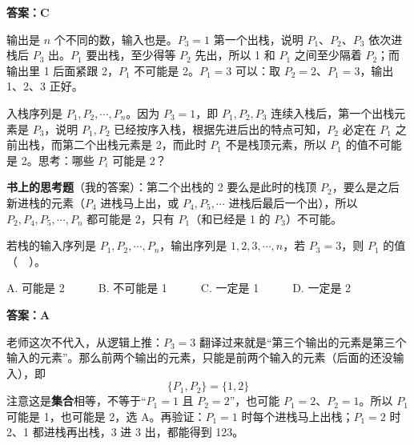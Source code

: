 \documentclass[10.5pt,a4paper,oneside]{article}
\newcommand{\hlred}[1]{\textcolor{wdred}{\bfseries #1}}
\newcommand{\cueblock}[2]{\Needspace{4\baselineskip}\leavevmode#1{#2}\par\vspace{-\baselineskip}\vspace{-\parskip}}
\newcommand{\cuebox}[1]{\leavevmode\llap{\smash{\begin{minipage}[t]{\marginparwidth}\raggedright\small\linespread{1.18}\selectfont #1\end{minipage}}\hspace{\marginparsep}}}
\newcommand{\cuenote}[1]{\cuebox{{\color{wdblue}\bfseries Q\,}\color{wddark}#1}}
\begin{document}
\hlred{\textbf{答案：C}}

\begin{videobox}

输出是 \(n\) 个不同的数，输入也是。\(P_3=1\) 第一个出栈，说明
\(P_1\)、\(P_2\)、\(P_3\) 依次进栈后 \(P_3\) 出。\(P_1\)
要出栈，至少得等 \(P_2\) 先出，所以 1 和 \(P_1\) 之间至少隔着
\(P_2\)；而输出里 1 后面紧跟 2，\(P_1\) 不可能是 2。\(P_1=3\) 可以：取
\(P_2=2\)、\(P_1=3\)，输出 1、2、3 正好。

\end{videobox}

\begin{jiexibox}

入栈序列是 \(P_1, P_2, \cdots, P_n\)。因为 \(P_3=1\)，即
\(P_1, P_2, P_3\) 连续入栈后，第一个出栈元素是 \(P_3\)，说明
\(P_1, P_2\) 已经按序入栈，根据先进后出的特点可知，\(P_2\) 必定在
\(P_1\) 之前出栈，而第二个出栈元素是 2，而此时 \(P_1\)
不是栈顶元素，所以 \(P_1\) 的值不可能是 2。思考：哪些 \(P_i\) 可能是 2？

\end{jiexibox}

\begin{addbox}

\textbf{书上的思考题}（我的答案）：第二个出栈的 2 要么是此时的栈顶
\(P_2\)，要么是之后新进栈的元素（\(P_4\) 进栈马上出，或
\(P_4, P_5, \cdots\) 进栈后最后一个出），所以
\(P_2, P_4, P_5, \cdots, P_n\) 都可能是 2，只有 \(P_1\)（和已经是 1 的
\(P_3\)）不可能。

\end{addbox}

\vspace{22pt}

\cueblock{\cuenote}{\relax{\(P_3=3\) 能推出 \(\{P_1, P_2\}\) 是什么？}}

\begin{questionbox}[21]

若栈的输入序列是 \(P_1, P_2, \cdots, P_n\)，输出序列是
\(1, 2, 3, \cdots, n\)，若 \(P_3=3\)，则 \(P_1\) 的值（　）。

A. 可能是 2　　　B. 不可能是 1　　　C. 一定是 1　　　D. 一定是 2

\end{questionbox}

\hlred{\textbf{答案：A}}

\begin{videobox}

老师这次不代入，从逻辑上推：\(P_3=3\)
翻译过来就是“第三个输出的元素是第三个输入的元素”。那么前两个输出的元素，只能是前两个输入的元素（后面的还没输入），即
\[\{P_1, P_2\}=\{1, 2\}\] 注意这是\textbf{集合}相等，不等于“\(P_1=1\) 且
\(P_2=2\)”，也可能 \(P_1=2\)、\(P_2=1\)。所以 \(P_1\) 可能是 1，也可能是
2，选 A。再验证：\(P_1=1\) 时每个进栈马上出栈；\(P_1=2\) 时 2、1
都进栈再出栈，3 进 3 出，都能得到 123。

\end{videobox}
\end{document}
